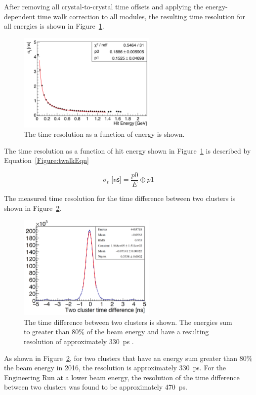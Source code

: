 After removing all crystal-to-crystal time offsets and applying the energy-dependent time walk correction to all modules, the resulting time resolution for all energies is shown in Figure~\ref{Figure:timeRes}. 

\begin{figure}[H]
  \centering
      \includegraphics[width=0.6\textwidth]{pics/performance/timeRes2016.png}
  \caption[Time resolution of the ECal for the 2016 run ]{The time resolution as a function of energy is shown.}
  \label{Figure:timeRes}
\end{figure}

The time resolution as a function of hit energy shown in Figure~\ref{Figure:timeRes} is described by Equation~\eqref{Figure:twalkEqn}

\begin{equation}
	\label{eq:twalkEqn}
		\sigma_t \textsf{ [ns]} = \dfrac{p0}{E}\oplus p1	
\end{equation}

The measured time resolution for the time difference between two clusters is shown in Figure~\ref{Figure:timeRes2cl}.

\begin{figure}[H]
  \centering
      \includegraphics[width=0.6\textwidth]{pics/performance/2clusterTres.png}
  \caption[Time resolution for the time difference between two clusters]{The time difference between two clusters is shown. The energies sum to greater than 80$\%$ of the beam energy and have a resulting resolution of approximately 330~ps .}
  \label{Figure:timeRes2cl}
\end{figure}

As shown in Figure~\ref{Figure:timeRes2cl}, for two clusters that have an energy sum greater than 80$\%$ the beam energy in 2016, the resolution is approximately 330~ps. For the Engineering Run at a lower beam energy, the resolution of the time difference between two clusters was found to be approximately 470~ps. 